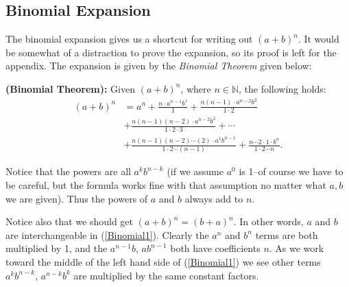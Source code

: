 \subsection{Binomial Expansion}
The binomial expansion gives us a shortcut for writing out
$(a+b)^n$.  It would be somewhat of a distraction to prove
the expansion, so its proof is left for the appendix.
The expansion is given by the {\it Binomial Theorem} given
below:

\begin{theorem} {\rm\bf (Binomial Theorem):} Given $(a+b)^n$,
 where $n\in\mathbb{N}$, 
the following holds\footnotemark:
\begin{equation}
\begin{aligned}
(a+b)^n&=a^n+\frac{n\cdot a^{n-1}b^1}{1}
+\frac{n(n-1)\cdot a^{n-2}b^2}{1\cdot 2}\\
&+\frac{n(n-1)(n-2)\cdot a^{n-2}b^2}{1\cdot2\cdot3}+\cdots\\
&+\frac{n(n-1)(n-2)\cdots(2)\cdot a^{1}b^{n-1}}{1\cdot2\cdots(n-1)}
+\frac{n\cdots2\cdot1\cdot b^n}{1\cdot 2\cdots n}.
\end{aligned}\label{Binomial1}
\end{equation}\end{theorem}
Notice that the powers are all $a^kb^{n-k}$ (if we assume $a^0$
is  1--of course we have to be careful, but the formula
works fine with that assumption no matter what $a,b$ we
are given).
Thus the powers of $a$ and $b$ always add to $n$.

Notice also that we should get $(a+b)^n=(b+a)^n$.  In other
words, $a$ and $b$ are interchangeable in  (\ref{Binomial1}).
Clearly the $a^n$ and $b^n$ terms are both multiplied by 1,
and the $a^{n-1}b$, $ab^{n-1}$ both have coefficients $n$.
As we work toward the middle of the left hand side of 
(\ref{Binomial1}) we see other terms $a^kb^{n-k}$, $a^{n-k}b^k$
are multiplied by the same constant factors.

